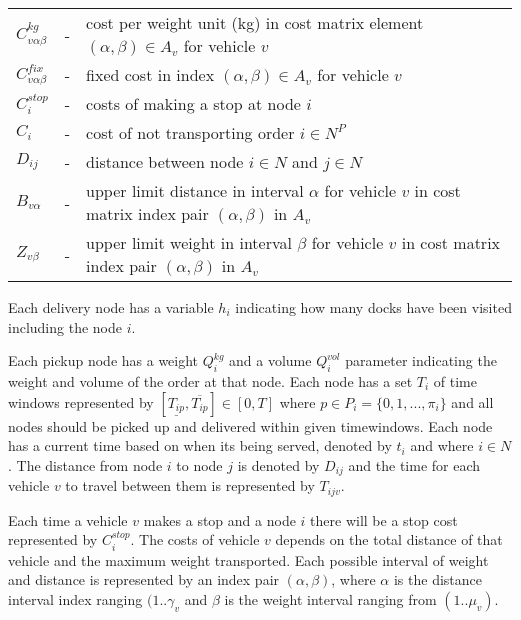 \documentclass[a4paper,10pt]{article}
\begin{document}
\begin{tabular}{l c l }
    $C^{kg}_{v\alpha\beta}  $	&-& cost per weight unit (kg) in cost matrix element 
                                    $(\alpha, \beta) \in A_v$ for vehicle $v$	                \\
    $C^{fix}_{v\alpha\beta} $	&-& fixed cost in index $(\alpha, \beta) \in A_v$ for vehicle $v$	\\
    $C^{stop}_i             $   &-& costs of making a stop at node $i$ 	                        \\
    $C_i                    $   &-& cost of not transporting order $i\in N^P$                   \\
    $D_{ij}	            $   &-& distance between node $i\in N$ and  $j\in N$		\\
    $B_{v\alpha}            $   &-& upper limit distance in interval $\alpha$ for vehicle $v$ 
                                    in cost matrix index pair $(\alpha,\beta)$ in $A_v$         \\
    $Z_{v\beta}             $   &-& upper limit weight in interval $\beta$ for vehicle $v$ in  
                                    cost matrix index pair $(\alpha,\beta)$ in $A_v$            \\ 
\end{tabular}
\linebreak
\linebreak
\par
Each delivery node has a variable $h_{i}$ indicating how many docks have been visited including the node $i$. \par 
Each pickup node has a weight $Q_i^{kg}$ and a volume $Q_i^{vol}$ parameter indicating the weight and volume of the order at that node.
Each node has a set $T_{i}$ of time windows represented by $[ \underline{T_{ip}},  \overline{T_{ip}} ] \in [0,T]$ where $p \in P_i=\{0,1,...,\pi_i\}$ and all nodes should be picked up and delivered within given timewindows.
Each node has a current time based on when its being served, denoted by $t_{i}$ and where $i \in N$. 
The distance from node $i$ to node $j$ is denoted by $D_{ij}$ and the time for each vehicle $v$ to travel between them is represented by $T_{ijv}$. \par 
Each time a vehicle $v$ makes a stop and a node $i$ there will be a stop cost represented by $C_i^{stop}$. 
The costs of vehicle $v$ depends on the total distance of that vehicle and the maximum weight transported. 
Each possible interval of weight and distance is represented by an index pair $(\alpha,\beta)$, where $\alpha$ is the distance interval index ranging $(1..\gamma_v$ and $\beta$ is the weight interval ranging from $(1..\mu_v)$. 
\end{document}
